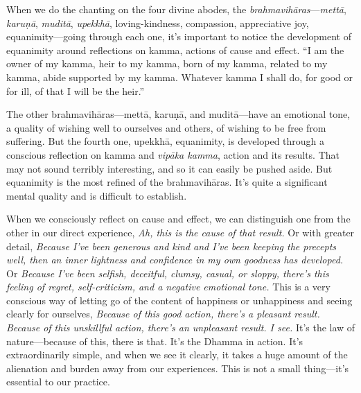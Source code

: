 
When we do the chanting on the four divine abodes, the 
\emph{brahmavihāras}---\emph{mettā}, \emph{karuṇā}, 
\emph{muditā}, \emph{upekkhā}, loving-kindness, compassion, 
appreciative joy, equanimity---going through each one, it's important 
to notice the development of equanimity around reflections on kamma, 
actions of cause and effect. ``I am the owner of my kamma, heir to my 
kamma, born of my kamma, related to my kamma, abide supported by my 
kamma. Whatever kamma I shall do, for good or for ill, of that I will 
be the heir.''

The other brahmavihāras---mettā, karuṇā, and muditā---have an 
emotional tone, a quality of wishing well to ourselves and others, of 
wishing to be free from suffering. But the fourth one, upekkhā, 
equanimity, is developed through a conscious reflection on kamma and 
\emph{vipāka kamma}, action and its results. That may not sound 
terribly interesting, and so it can easily be pushed aside. But 
equanimity is the most refined of the brahmavihāras. It's quite a 
significant mental quality and is difficult to establish.

When we consciously reflect on cause and effect, we can distinguish one 
from the other in our direct experience, \emph{Ah, this is the cause of 
that result.} Or with greater detail, \emph{Because I've been generous 
and kind and I've been keeping the precepts well, then an inner 
lightness and confidence in my own goodness has developed.} Or 
\emph{Because I've been selfish, deceitful, clumsy, casual, or sloppy, 
there's this feeling of regret, self-criticism, and a negative 
emotional tone.} This is a very conscious way of letting go of the 
content of happiness or unhappiness and seeing clearly for ourselves, 
\emph{Because of this good action, there's a pleasant result. Because 
of this unskillful action, there's an unpleasant result. I see.} It's 
the law of nature---because of this, there is that. It's the Dhamma in 
action. It's extraordinarily simple, and when we see it clearly, it 
takes a huge amount of the alienation and burden away from our 
experiences. This is not a small thing---it's essential to our practice.

